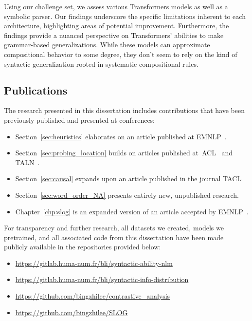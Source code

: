 Using our challenge set, we assess various Transformers models as well as a symbolic parser. Our findings underscore the specific limitations inherent to each architecture, highlighting areas of potential improvement. Furthermore, the findings provide a nuanced perspective on Transformers' abilities to make grammar-based generalizations. While these models can approximate compositional behavior to some degree, they don't seem to rely on the kind of syntactic generalization rooted in systematic compositional rules. 



\subsection{Publications}

 The research presented in this dissertation includes contributions that have been previously published and presented at conferences:
 \begin{itemize}[itemsep=0.6pt]
     \item Section~\ref{sec:heuristics} elaborates on an article published at \textsc{EMNLP}~\citep{li-etal-2021-transformers}.
     \item Section~\ref{sec:probing_location} builds on articles published at~\textsc{ACL}~\citep{li-etal-2022-distributed} and \textsc{TALN}~\citep{li-etal-2022-les}.
     \item Section~\ref{sec:causal} expands upon an article published in the journal TACL~\citep{li-etal-2023-assessing}
     \item Section~\ref{sec:word_order_NA} presents entirely new, unpublished research.
     \item Chapter~\ref{chp:slog} is an expanded version of an article accepted by EMNLP~\citep{li2023slog}. 
 \end{itemize}


 For transparency and further research, all datasets we created, models we pretrained, and all associated code from this dissertation have been made publicly available in the repositories provided below:  
 \begin{itemize}[itemsep=0.6pt]
     \item \url{https://gitlab.huma-num.fr/bli/syntactic-ability-nlm}
     \item \url{https://gitlab.huma-num.fr/bli/syntactic-info-distribution}
     \item \url{https://github.com/bingzhilee/contrastive_analysis}
     \item \url{https://github.com/bingzhilee/SLOG}
 \end{itemize}


